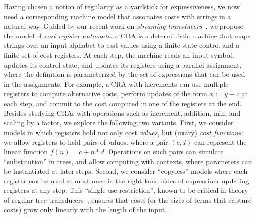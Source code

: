 \documentclass[11pt]{article}
\begin{document}
Having chosen a notion of regularity as a yardstick for
expressiveness, we now need a corresponding machine model that
associates costs with strings in a natural way.  Guided by our recent
work on {\em streaming
transducers\/}~\cite{alur_streaming_2011,alur_stt_2011}, we propose
the model of {\em cost register automata}: a CRA is a deterministic
machine that maps strings over an input alphabet to cost values using
a finite-state control and a finite set of cost registers.  At each
step, the machine reads an input symbol, updates its control state,
and updates its registers using a parallel assignment, where the
definition is parameterized by the set of expressions that can be used
in the assignments.  For example, a CRA with increments can use
multiple registers to compute alternative costs, perform updates of
the form $x := y+c$ at each step, and commit to the cost computed in
one of the registers at the end.  Besides studying CRAs with
operations such as increment, addition, min, and scaling by a factor,
we explore the following two variants.  First, we consider models in
which registers hold not only cost {\em values}, but (unary) {\em cost
functions\/}: we allow registers to hold pairs of values, where a pair
$(c,d)$ can represent the linear function $f(n)=c+n*d$.  Operations on
such pairs can simulate ``substitution'' in trees, and allow computing
with contexts, where parameters can be instantiated at later steps.
Second, we consider ``copyless'' models where each register can be
used at most once in the right-hand-sides of expressions updating
registers at any step.  This ``single-use-restriction'', known to be
critical in theory of regular tree
transducers~\cite{engelfriet_macro2_1999}, ensures that costs (or the
sizes of terms that capture costs) grow only linearly with the length
of the input.
\end{document}
